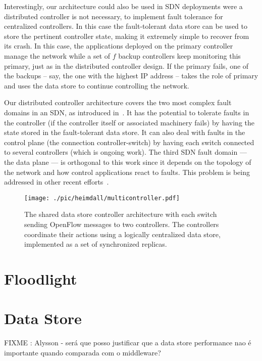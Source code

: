Interestingly, our architecture could also be used in SDN deployments were a distributed controller is not necessary, to implement fault tolerance for centralized controllers.
In this case the fault-tolerant data store can be used to store the pertinent controller state, making it extremely simple to recover from its crash.
In this case, the applications deployed on the primary controller manage the network while a set of $f$ backup controllers keep monitoring this primary, just as in the distributed controller design.
If the primary fails, one of the backups -- say, the one with the highest IP address -- takes the role of primary and uses the data store to continue controlling the network.

Our distributed controller architecture covers the two most complex fault domains in an SDN, as introduced in~\cite{kim2012}.
It has the potential to tolerate faults in the controller (if the controller itself or associated machinery fails) by having the state stored in the fault-tolerant data store.
It can also deal with faults in the control plane (the connection controller-switch) by having each switch connected to several controllers (which is ongoing work).
The third SDN fault domain --- the data plane --- is orthogonal to this work since it depends on the topology of the network and how control applications react to faults.
This problem is being addressed in other recent efforts~\cite{kim2012,Reitblatt2013}.

\begin{figure}
\centering
\texttt{[image: ./pic/heimdall/multicontroller.pdf]}
\caption[Heimdall Architecture]{The shared data store controller
  architecture with each switch sending OpenFlow messages to two
  controllers. The controllers coordinate their actions using a
  logically centralized data store, implemented as a set of
  synchronized replicas. }
\label{fig:architecture} 
\end{figure}

\section{Floodlight} 
\glsresetall
\label{sec:heimdall:floodlight}

\section{Data Store}
\glsresetall
\label{sec:heimdall:dataStore}
\label{sec:heimdall:datastore:bft-smart}
FIXME : Alysson - será que posso justificar que a data store
performance nao é importante quando comparada com o middleware? 

